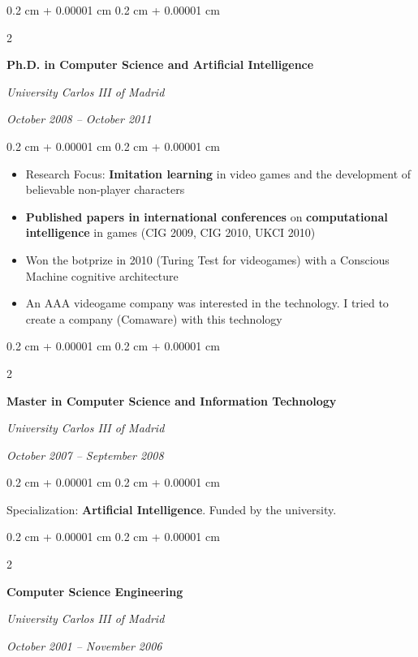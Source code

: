 \documentclass[10pt, letterpaper]{article}
\newenvironment{highlights}{
	\begin{itemize}[
		topsep=0.10 cm,
		parsep=0.10 cm,
		partopsep=0pt,
		itemsep=0pt,
		leftmargin=0.4 cm + 10pt
	]
	}{
	\end{itemize}
} %
\newenvironment{onecolentry}{
	\begin{adjustwidth}{
		0.2 cm + 0.00001 cm
	}{
		0.2 cm + 0.00001 cm
	}
	}{
	\end{adjustwidth}
} %
\newenvironment{twocolentry}[2][]{
	\onecolentry
	\def\secondColumn{#2}
	\setcolumnwidth{\fill, 5.5 cm}
	\begin{paracol}{2}
	}{
		\switchcolumn \raggedleft \secondColumn
	\end{paracol}
	\endonecolentry
} %
\newcommand{\dlterm}[1]{\textbf{#1}}
\begin{document}
	\vspace{0.2 cm}

	\begin{twocolentry}{
		\textit{October 2008 – October 2011}}
		\textbf{Ph.D. in Computer Science and Artificial Intelligence}
		
		\textit{University Carlos III of Madrid}
	\end{twocolentry}

	\vspace{0.10 cm}
	\begin{onecolentry}
		\begin{highlights}
			\item Research Focus: \dlterm{Imitation learning} in video games and the development of believable non-player characters
			\item \textbf{Published papers in international conferences} on \dlterm{computational intelligence} in games (CIG 2009, CIG 2010, UKCI 2010)
			\item Won the botprize in 2010 (Turing Test for videogames) with a Conscious Machine cognitive architecture
			\item An AAA videogame company was interested in the technology. I tried to create a company (Comaware) with this technology
		\end{highlights}
	\end{onecolentry}

	\vspace{0.2 cm}

	\begin{twocolentry}{
		\textit{October 2007 – September 2008}}
		\textbf{Master in Computer Science and Information Technology}
		
		\textit{University Carlos III of Madrid}
	\end{twocolentry}

	\vspace{0.10 cm}
	\begin{onecolentry}
		Specialization: \dlterm{Artificial Intelligence}. Funded by the university.
	\end{onecolentry}

	\vspace{0.2 cm}

	\begin{twocolentry}{
		\textit{October 2001 – November 2006}}
		\textbf{Computer Science Engineering}
		
		\textit{University Carlos III of Madrid}
	\end{twocolentry}
\end{document}
